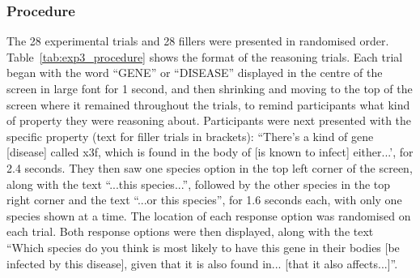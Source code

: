 \subsubsection{Procedure}

The 28 experimental trials and 28 fillers were presented in randomised order.
Table~\ref{tab:exp3_procedure} shows the format of the reasoning trials.
Each trial began with the word ``GENE'' or ``DISEASE''
displayed in the centre of the screen in large font for 1 second,
and then shrinking and moving to the top of the screen
where it remained throughout the trials,
to remind participants what kind of property they were reasoning about.
Participants were next presented with the specific property
(text for filler trials in brackets):
``There's a kind of gene [disease] called x3f,
which is found in the body of [is known to infect] either...',
for 2.4 seconds.
They then saw one species option in
the top left corner of the screen,
along with the text ``...this species...'',
followed by the other species
in the top right corner
and the text ``...or this species'',
for 1.6 seconds each, with only one species shown at a time.
The location of each response option was randomised on each trial.
Both response options were then displayed,
along with the text
``Which species do you think is most likely to
have this gene in their bodies
[be infected by this disease],
given that it is also found in...
[that it also affects...]''.


